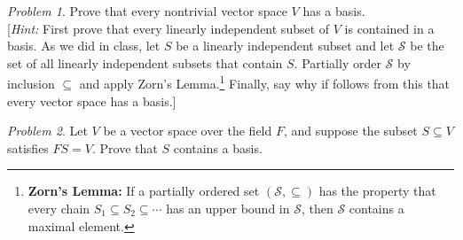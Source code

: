 \documentclass[11pt]{paper}
\theoremstyle{remark}
\newtheorem{problem}{Problem}
\newcommand\0{\ensuremath{\mathbf{0}}}
\newcommand{\<}{\ensuremath{\langle}}
\renewcommand{\>}{\ensuremath{\rangle}}
\newcommand{\sS}{\ensuremath{\mathscr{S}}}
\begin{document}
\probskip

\begin{problem}
\label{prob:zorn}
Prove that every nontrivial vector space $V$ has a basis.\\[4pt]
[{\it Hint:} First prove that
every linearly independent subset of $V$ is contained in a basis.
As we did in class, let $S$ be a linearly independent subset and
  let $\sS$ be the set of all linearly independent subsets that contain $S$. 
  Partially order $\sS$ by inclusion $\subseteq$ and apply
  Zorn's Lemma.\footnote{{\bf Zorn's Lemma:} 
    If a partially ordered set $(\sS, \subseteq)$ has the property that every
    chain $S_1 \subseteq S_2 \subseteq \cdots$ has an upper bound in $\sS$, 
    then $\sS$ contains a maximal element.}
  Finally, say why if follows from this that every vector space has a basis.]
\end{problem}

\probskip

\begin{problem}
Let $V$ be a vector space over the field $F$, and suppose the subset 
$S \subseteq V$ satisfies $FS = V$. Prove that $S$ contains a basis.
\end{problem}

\probskip
\end{document}

